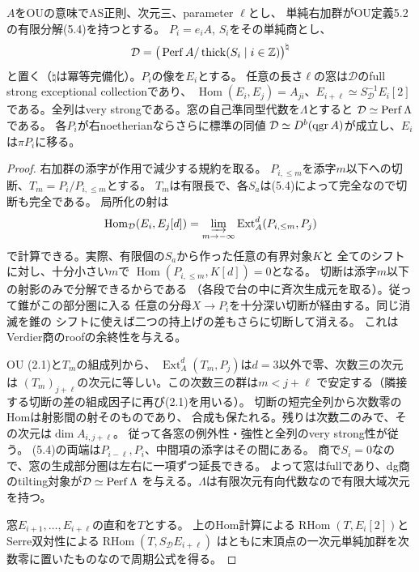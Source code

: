 \begin{proposition}[OU型の有限次元加群による商]
\label{prop:ou-perfect-tail-comparison}
$A$をOUの意味でAS正則、次元三、parameter $\ell$とし、
単純右加群がOU定義5.2の有限分解(5.4)を持つとする。
$P_i=e_i A$, $S_i$をその単純商とし、
\[
 \mathcal D=\big(\operatorname{Perf} A/\operatorname{thick}(S_i\mid i\in\mathbb Z)\big)^{\natural}
\]
と置く（$\natural$は冪等完備化）。$P_i$の像を$E_i$とする。
任意の長さ$\ell$の窓は$\mathcal D$のfull strong exceptional collectionであり、
$\operatorname{Hom}(E_i,E_j)=A_{ji}$、$E_{i+\ell}\simeq S_{\mathcal D}^{-1}E_i[2]$
である。全列はvery strongである。窓の自己準同型代数を$\Lambda$とすると
$\mathcal D\simeq\operatorname{Perf}\Lambda$である。
各$P_i$が右noetherianならさらに標準の同値
$\mathcal D\simeq D^b(\operatorname{qgr} A)$が成立し、$E_i$は$\pi P_i$に移る。
\end{proposition}
\begin{proof}
右加群の添字が作用で減少する規約を取る。
$P_{i,\le m}$を添字$m$以下への切断、$T_m=P_i/P_{i,\le m}$とする。
$T_m$は有限長で、各$S_a$は(5.4)によって完全なので切断も完全である。
局所化の射は
\[
 \operatorname{Hom}_{\mathcal D}(E_i,E_j[d])
 =\varinjlim_{m\to-\infty}\operatorname{Ext}^d_A(P_{i,\le m},P_j)
\]
で計算できる。実際、有限個の$S_a$から作った任意の有界対象$K$と
全てのシフトに対し、十分小さい$m$で
$\operatorname{Hom}(P_{i,\le m},K[d])=0$となる。
切断は添字$m$以下の射影のみで分解できるからである
（各段で台の中に斉次生成元を取る）。従って錐がこの部分圏に入る
任意の分母$X\to P_i$を十分深い切断が経由する。同じ消滅を錐の
シフトに使えば二つの持上げの差もさらに切断して消える。
これはVerdier商のroofの余終性を与える。

OU (2.1)と$T_m$の組成列から、
$\operatorname{Ext}^d_A(T_m,P_j)$は$d=3$以外で零、次数三の次元は
$(T_m)_{j+\ell}$の次元に等しい。この次数三の群は$m<j+\ell$
で安定する（隣接する切断の差の組成因子に再び(2.1)を用いる）。
切断の短完全列から次数零のHomは射影間の射そのものであり、
合成も保たれる。残りは次数二のみで、その次元は$\dim A_{i,j+\ell}$。
従って各窓の例外性・強性と全列のvery strong性が従う。
(5.4)の両端は$P_{i-\ell},P_i$、中間項の添字はその間にある。
商で$S_i=0$なので、窓の生成部分圏は左右に一項ずつ延長できる。
よって窓はfullであり、dg商のtilting対象が$\mathcal D\simeq\operatorname{Perf}\Lambda$
を与える。$\Lambda$は有限次元有向代数なので有限大域次元を持つ。

窓$E_{i+1},\ldots,E_{i+\ell}$の直和を$T$とする。
上のHom計算による$\operatorname{RHom}(T,E_i[2])$と
Serre双対性による$\operatorname{RHom}(T,S_{\mathcal D}E_{i+\ell})$
はともに末頂点の一次元単純加群を次数零に置いたものなので周期公式を得る。


\end{proof}
